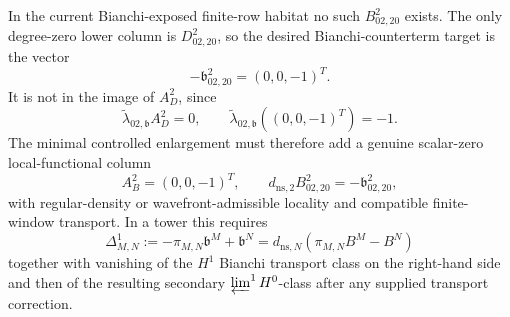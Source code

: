 \documentclass[11pt]{memoir}
\begin{document}
\begin{prop}
  In the current Bianchi-exposed finite-row habitat no such
  \(B^2_{02,20}\) exists.  The only degree-zero lower column is
  \(D^2_{02,20}\), so the desired Bianchi-counterterm target is the
  vector
  \[
    -\mathfrak b^2_{02,20}=(0,0,-1)^T .
  \]
  It is not in the image of \(A_D^2\), since
  \[
    \widetilde\lambda_{02,\mathfrak b}A_D^2=0,\qquad
    \widetilde\lambda_{02,\mathfrak b}((0,0,-1)^T)=-1 .
  \]
  The minimal controlled enlargement must therefore add a genuine
  scalar-zero local-functional column
  \[
    A_B^2=(0,0,-1)^T,\qquad
    d_{\mathrm{ns},2}B^2_{02,20}
      =-\mathfrak b^2_{02,20},
  \]
  with regular-density or wavefront-admissible locality and compatible
  finite-window transport.  In a tower this requires
  \[
    \Delta^1_{M,N}
    :=
    -\pi_{M,N}\mathfrak b^M+\mathfrak b^N
    =
    d_{\mathrm{ns},N}(\pi_{M,N}B^M-B^N)
  \]
  together with vanishing of the \(H^1\) Bianchi transport class on the
  right-hand side and then of the resulting secondary
  \(\varprojlim^1H^0\)-class after any supplied transport correction.
\end{prop}
\end{document}
